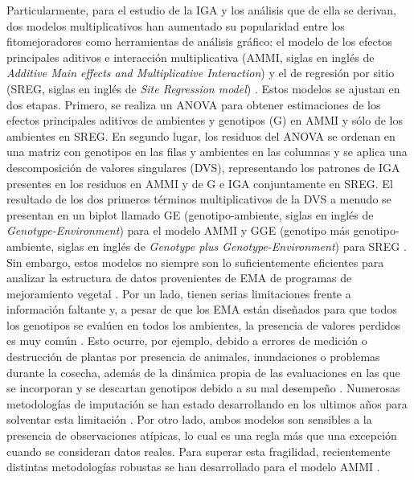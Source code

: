 Particularmente, para el estudio de la IGA y los análisis que de ella se derivan, dos modelos multiplicativos han aumentado su popularidad entre los fitomejoradores como herramientas de análisis gráfico: el modelo de los efectos principales aditivos e interacción multiplicativa (AMMI, siglas en inglés de \emph{Additive Main effects and Multiplicative Interaction}) \citep{Gauch1988, Gauch1992} y el de regresión por sitio (SREG, siglas en inglés de \emph{Site Regression model}) \citep{Corneliusetal1996, CrossaCornelius1997}. Estos modelos se ajustan en dos etapas. Primero, se realiza un ANOVA para obtener estimaciones de los efectos principales aditivos de ambientes y genotipos (G) en AMMI y sólo de los ambientes en SREG. En segundo lugar, los residuos del ANOVA se ordenan en una matriz con genotipos en las filas y ambientes en las columnas y se aplica una descomposición de valores singulares (DVS), representando los patrones de IGA presentes en los residuos en AMMI y de G e IGA conjuntamente en SREG. El resultado de los dos primeros términos multiplicativos de la DVS a menudo se presentan en un biplot llamado GE (genotipo-ambiente, siglas en inglés de \emph{Genotype-Environment}) para el modelo AMMI \citep{Zobel1988} y GGE (genotipo más genotipo-ambiente, siglas en inglés de \emph{Genotype plus Genotype-Environment}) para SREG \citep{Yanetal2000}. Sin embargo, estos modelos no siempre son lo suficientemente eficientes para analizar la estructura de datos provenientes de EMA de programas de mejoramiento vegetal \citep{deOliveira2016, Jarquin2016, Hadaschetal2018}. Por un lado, tienen serias limitaciones frente a información faltante y, a pesar de que los EMA están diseñados para que todos los genotipos se evalúen en todos los ambientes, la presencia de valores perdidos es muy común \citep{Woyann2017, Aguate2019}. Esto ocurre, por ejemplo, debido a errores de medición o destrucción de plantas por presencia de animales, inundaciones o problemas durante la cosecha, además de la dinámica propia de las evaluaciones en las que se incorporan y se descartan genotipos debido a su mal desempeño \citep{HillRosenberg1985}. Numerosas metodologías de imputación se han estado desarrollando en los ultimos años para solventar esta limitación \citep{Alarconetal2010, Alarconetal2014, JosseHusson2016, Alarconetal2020}. Por otro lado, ambos modelos son sensibles a la presencia de observaciones atípicas, lo cual es una regla más que una excepción cuando se consideran datos reales. Para superar esta fragilidad, recientemente distintas metodologías robustas se han desarrollado para el modelo AMMI \citep{Rodriguesetal2016}. 

